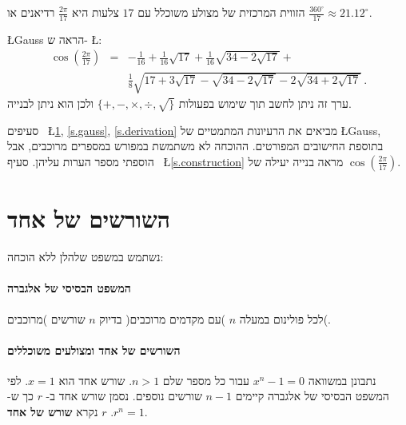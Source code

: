\documentclass[11pt,a4paper]{article}
\newenvironment{form}[1]{%
\begin{displaymath}%
\renewcommand{\arraystretch}{#1}%
\begin{array}{lcl}}%
{\end{array}%
\end{displaymath}%
}
\newcommand*{\disfrac}[2]{\displaystyle\frac{#1}{#2}}
\newcommand*{\sm}[1]{$\scriptstyle #1$}
\begin{document}
הזווית המרכזית של מצולע משוכלל עם 
$17$
צלעות היא
$\disfrac{2\pi}{17}$
רדיאנים או
$\disfrac{360^\circ}{17}\approx 21.12^\circ$. 
\begin{center}
\end{center}
\L{Gauss}
הראה ש-%
\L{\cite{gauss,jorg}}:
\begin{form}{3}
\cos\left(\disfrac{2\pi}{17}\right) &=& 
-\disfrac{1}{16}+\disfrac{1}{16}\sqrt{17} + 
     \disfrac{1}{16}\sqrt{34-2\sqrt{17}}
    + \\
    &&
     \disfrac{1}{8}\sqrt{
     17+3\sqrt{17} - 
     \sqrt{34-2\sqrt{17}}
   -2
     \sqrt{34+2\sqrt{17}}
   }\,.
\end{form}
ערך זה ניתן לחשב תוך שימוש בפעולות
$\{+,-,\times,\div,\surd\}$
ולכן הוא ניתן לבנייה. 

סעיפים~%
\L{\ref{s.roots}, \ref{s.gauss}, \ref{s.derivation}}
מביאים את הרעיונות המתמטיים של
\L{Gauss},
בתוספת החישובים המפורטים.
ההוכחה לא משתמשת במפורש במספרים מרוכבים, אבל הוספתי מספר הערות עליהן.
סעיף~%
\L{\ref{s.construction}}
מראה בנייה יעילה של
$\cos\left(\disfrac{2\pi}{17}\right)$.

\newpage

\section{השורשים של אחד}\label{s.roots}

נשתמש במשפט שלהלן ללא הוכחה:
\paragraph{המשפט הבסיסי של אלגברה}
לכל פולינום במעלה 
$n$
)עם מקדמים מרוכבים(
בדיוק
$n$
שורשים
)מרוכבים(.

\paragraph{%
השורשים של אחד ומצולעים משוכללים%
}
נתבונן במשוואה
$x^{n}-1=0$
עבור כל מספר שלם
$n>	 1$.
שורש אחד הוא
$x=1$.
לפי המשפט הבסיסי של אלגברה קיימים
$n-1$
שורשים נוספים. נסמן שורש אחד ב-%
$r$
כך ש-%
$r^{n}=1$.
$r$
נקרא
\textbf{שורש של אחד}.
\end{document}
